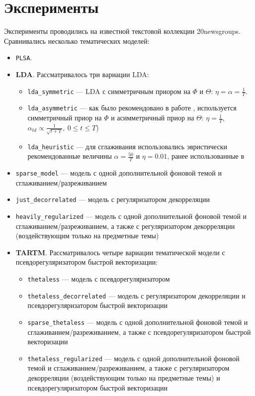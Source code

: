 \section{Эксперименты}
Эксперименты проводились на известной текстовой коллекции 20newsgroups. Сравнивались несколько тематических моделей: 

\begin{itemize}
    \item \texttt{PLSA}.
    \item \textbf{LDA}. Рассматривалось три вариации LDA:
    \begin{itemize}
        \item \texttt{lda\_symmetric} --- LDA с симметричным приором на $\Phi$ и $\Theta$: $\eta = \alpha = \frac{1}{T}$.
        \item \texttt{lda\_asymmetric} --- как было рекомендовано в работе \cite{wallach2009rethinking}, используется симметричный приор на $\Phi$ и асимметричный приор на $\Theta$: $\eta=\frac{1}{T}$, $\alpha_{td}\propto\frac{1}{\sqrt{t + T}},~0\leq t \leq T$)
        \item \texttt{lda\_heuristic} --- для сглаживания использовались эвристически рекомендованные величины $\alpha=\frac{50}{T}$ и $\eta=0.01$, ранее использованные в \cite{biggers2014configuring}\cite{rosen2016mobile}
    \end{itemize}
    \item \texttt{sparse\_model} --- модель с одной дополнительной фоновой темой и сглаживанием/разреживанием
    \item \texttt{just\_decorrelated} --- модель с регуляризатором декорреляции
    \item \texttt{heavily\_regularized} --- модель с одной дополнительной фоновой темой и сглаживанием/разреживанием, а также с регуляризатором декорреляции (воздействующим только на предметные темы)
    \item \textbf{TARTM}. Рассматривалось четыре вариации тематической модели с псевдорегуляризатором быстрой векторизации:
    \begin{itemize}
        \item \texttt{thetaless} --- модель с псевдорегуляризатором
        \item \texttt{thetaless\_decorrelated} --- модель с регуляризатором декорреляции и псевдорегуляризатором быстрой векторизации
        \item \texttt{sparse\_thetaless} --- модель с одной дополнительной фоновой темой и сглаживанием/разреживанием, а также с псевдорегуляризатором быстрой векторизации
        \item \texttt{thetaless\_regularized} --- модель с одной дополнительной фоновой темой и сглаживанием/разреживанием, а также с регуляризатором декорреляции (воздействующим только на предметные темы) и псевдорегуляризатором быстрой векторизации
    \end{itemize}
\end{itemize}

